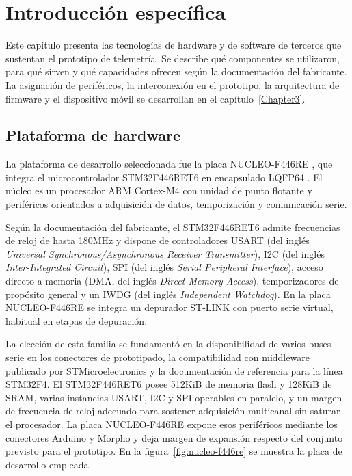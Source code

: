 \chapter{Introducción específica}

\label{Chapter2}

Este capítulo presenta las tecnologías de hardware y de software de terceros que sustentan el prototipo de telemetría. Se describe qué componentes se utilizaron, para qué sirven y qué capacidades ofrecen según la documentación del fabricante. La asignación de periféricos, la interconexión en el prototipo, la arquitectura de firmware y el dispositivo móvil se desarrollan en el capítulo~\ref{Chapter3}.

\section{Plataforma de hardware}
\label{sec:plataforma-hardware}

La plataforma de desarrollo seleccionada fue la placa NUCLEO-F446RE \citep{st_nucleo_f446re}, que integra el microcontrolador STM32F446RET6 en encapsulado LQFP64 \citep{st_stm32f446re}. El núcleo es un procesador ARM Cortex-M4 con unidad de punto flotante y periféricos orientados a adquisición de datos, temporización y comunicación serie.

Según la documentación del fabricante, el STM32F446RET6 admite frecuencias de reloj de hasta 180MHz y dispone de controladores USART (del inglés \textit{Universal Synchronous/Asynchronous Receiver Transmitter}), I2C (del inglés \textit{Inter-Integrated Circuit}), SPI (del inglés \textit{Serial Peripheral Interface}), acceso directo a memoria (DMA, del inglés \textit{Direct Memory Access}), temporizadores de propósito general y un IWDG (del inglés \textit{Independent Watchdog}). En la placa NUCLEO-F446RE se integra un depurador ST-LINK con puerto serie virtual, habitual en etapas de depuración.

La elección de esta familia se fundamentó en la disponibilidad de varios buses serie en los conectores de prototipado, la compatibilidad con middleware publicado por STMicroelectronics y la documentación de referencia para la línea STM32F4. El STM32F446RET6 posee 512KiB de memoria flash y 128KiB de SRAM, varias instancias USART, I2C y SPI operables en paralelo, y un margen de frecuencia de reloj adecuado para sostener adquisición multicanal sin saturar el procesador. La placa NUCLEO-F446RE expone esos periféricos mediante los conectores Arduino y Morpho y deja margen de expansión respecto del conjunto previsto para el prototipo. En la figura~\ref{fig:nucleo-f446re} se muestra la placa de desarrollo empleada.

